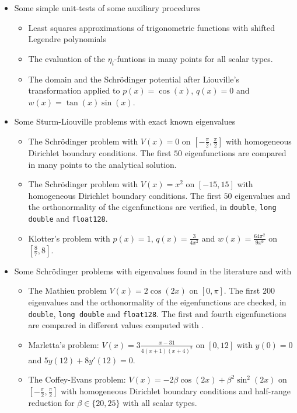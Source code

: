 \begin{itemize}
    \item Some simple unit-tests of some auxiliary procedures \begin{itemize}
              \item Least squares approximations of trigonometric functions with shifted Legendre polynomials
              \item The evaluation of the $\eta_i$-funtions in many points for all scalar types.
              \item The domain and the Schrödinger potential after Liouville's transformation applied to $p(x) = \cos(x)$, $q(x) = 0$ and $w(x) = \tan(x) \sin(x)$.
          \end{itemize}
    \item Some Sturm-Liouville problems with exact known eigenvalues \begin{itemize}
              \item The Schrödinger problem with $V(x) = 0$ on $\left[-\frac{\pi}{2}, \frac{\pi}{2}\right]$ with homogeneous Dirichlet boundary conditions. The first $50$ eigenfunctions are compared in many points to the analytical solution.
              \item The Schrödinger problem with $V(x) = x^2$ on $\left[-15, 15\right]$ with homogeneous Dirichlet boundary conditions. The first $50$ eigenvalues and the orthonormality of the eigenfunctions are verified, in \texttt{double}, \texttt{long double} and \texttt{float128}.
              \item Klotter's problem\cite{klotter_technische_1978} with $p(x) = 1$, $q(x) = \frac{3}{4x^2}$ and $w(x) = \frac{64\pi^2}{9 x^6}$ on $\left[\frac{8}{7}, 8\right]$.
          \end{itemize}
    \item Some Schrödinger problems with eigenvalues found in the literature and with \begin{itemize}
              \item The Mathieu problem $V(x)= 2\cos(2x)$ on $[0, \pi]$. The first $200$ eigenvalues and the orthonormality of the eigenfunctions are checked, in \texttt{double}, \texttt{long double} and \texttt{float128}. The first and fourth eigenfunctions are compared in different values computed with .
              \item Marletta's problem: $V(x) = 3\frac{x-31}{4(x+1)(x+4)^2}$ on $[0,12]$ with $y(0) = 0$ and $5 y(12) + 8 y'(12) = 0$.
              \item The Coffey-Evans problem: $V(x) = -2 \beta \cos(2x) + \beta^2 \sin^2(2x)$ on $\left[-\frac{\pi}{2}, \frac{\pi}{2}\right]$ with homogeneous Dirichlet boundary conditions and half-range reduction for $\beta \in \{20, 25\}$ with all scalar types.

\end{itemize}
\end{itemize}
